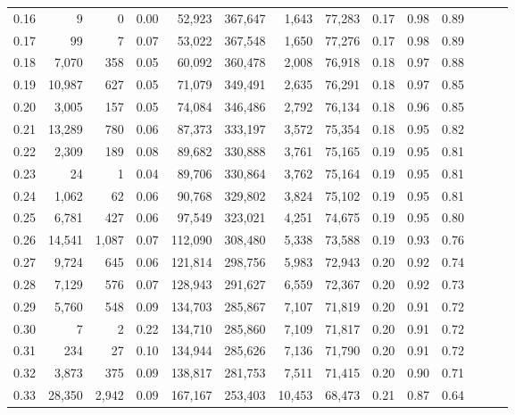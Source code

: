 \begin{tabular}{rrrrrrrrrrrrrr}
0.16 &       9 &      0 &  0.00 &   52,923 &  367,647 &   1,643 &  77,283 &  0.17 &  0.98 &      0.89 \\
0.17 &      99 &      7 &  0.07 &   53,022 &  367,548 &   1,650 &  77,276 &  0.17 &  0.98 &      0.89 \\
0.18 &   7,070 &    358 &  0.05 &   60,092 &  360,478 &   2,008 &  76,918 &  0.18 &  0.97 &      0.88 \\
0.19 &  10,987 &    627 &  0.05 &   71,079 &  349,491 &   2,635 &  76,291 &  0.18 &  0.97 &      0.85 \\
0.20 &   3,005 &    157 &  0.05 &   74,084 &  346,486 &   2,792 &  76,134 &  0.18 &  0.96 &      0.85 \\
0.21 &  13,289 &    780 &  0.06 &   87,373 &  333,197 &   3,572 &  75,354 &  0.18 &  0.95 &      0.82 \\
0.22 &   2,309 &    189 &  0.08 &   89,682 &  330,888 &   3,761 &  75,165 &  0.19 &  0.95 &      0.81 \\
0.23 &      24 &      1 &  0.04 &   89,706 &  330,864 &   3,762 &  75,164 &  0.19 &  0.95 &      0.81 \\
0.24 &   1,062 &     62 &  0.06 &   90,768 &  329,802 &   3,824 &  75,102 &  0.19 &  0.95 &      0.81 \\
0.25 &   6,781 &    427 &  0.06 &   97,549 &  323,021 &   4,251 &  74,675 &  0.19 &  0.95 &      0.80 \\
0.26 &  14,541 &  1,087 &  0.07 &  112,090 &  308,480 &   5,338 &  73,588 &  0.19 &  0.93 &      0.76 \\
0.27 &   9,724 &    645 &  0.06 &  121,814 &  298,756 &   5,983 &  72,943 &  0.20 &  0.92 &      0.74 \\
0.28 &   7,129 &    576 &  0.07 &  128,943 &  291,627 &   6,559 &  72,367 &  0.20 &  0.92 &      0.73 \\
0.29 &   5,760 &    548 &  0.09 &  134,703 &  285,867 &   7,107 &  71,819 &  0.20 &  0.91 &      0.72 \\
0.30 &       7 &      2 &  0.22 &  134,710 &  285,860 &   7,109 &  71,817 &  0.20 &  0.91 &      0.72 \\
0.31 &     234 &     27 &  0.10 &  134,944 &  285,626 &   7,136 &  71,790 &  0.20 &  0.91 &      0.72 \\
0.32 &   3,873 &    375 &  0.09 &  138,817 &  281,753 &   7,511 &  71,415 &  0.20 &  0.90 &      0.71 \\
0.33 &  28,350 &  2,942 &  0.09 &  167,167 &  253,403 &  10,453 &  68,473 &  0.21 &  0.87 &      0.64 \\

\end{tabular}
